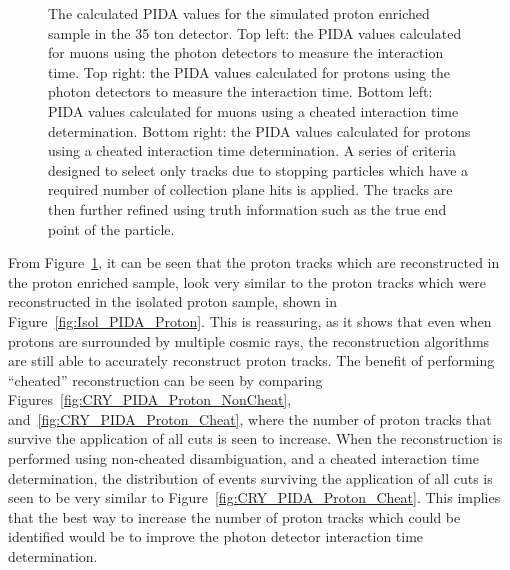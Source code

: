 \begin{figure}
  \caption[The calculated PIDA values for the simulated proton enriched sample in the 35 ton detector]
          {The calculated PIDA values for the simulated proton enriched sample in the 35 ton detector. Top left: the PIDA values calculated for muons using the photon detectors to measure the interaction time. Top right: the PIDA values calculated for protons using the photon detectors to measure the interaction time. Bottom left: PIDA values calculated for muons using a cheated interaction time determination. Bottom right: the PIDA values calculated for protons using a cheated interaction time determination. A series of criteria designed to select only tracks due to stopping particles which have a required number of collection plane hits is applied. The tracks are then further refined using truth information such as the true end point of the particle.}
  \label{fig:CRY_PIDA}
\end{figure}

From Figure~\ref{fig:CRY_PIDA}, it can be seen that the proton tracks which are reconstructed in the proton enriched sample, look very similar to the proton tracks which were reconstructed in the isolated proton sample, shown in Figure~\ref{fig:Isol_PIDA_Proton}. This is reassuring, as it shows that even when protons are surrounded by multiple cosmic rays, the reconstruction algorithms are still able to accurately reconstruct proton tracks. The benefit of performing ``cheated'' reconstruction can be seen by comparing Figures~\ref{fig:CRY_PIDA_Proton_NonCheat}, and~\ref{fig:CRY_PIDA_Proton_Cheat}, where the number of proton tracks that survive the application of all cuts is seen to increase. When the reconstruction is performed using non-cheated disambiguation, and a cheated interaction time determination, the distribution of events surviving the application of all cuts is seen to be very similar to Figure~\ref{fig:CRY_PIDA_Proton_Cheat}. This implies that the best way to increase the number of proton tracks which could be identified would be to improve the photon detector interaction time determination. \\


